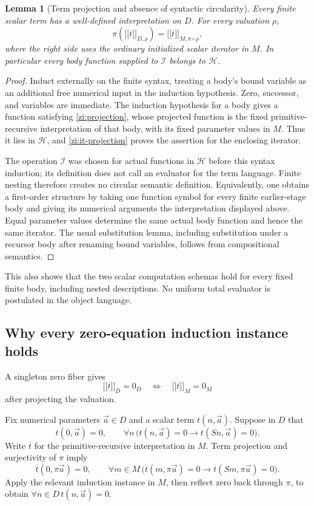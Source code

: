 \documentclass[11pt]{article}
\newtheorem{lemma}[theorem]{Lemma}
\theoremstyle{definition}
\newcommand{\llbracket}{\mathopen{[\![}}
\newcommand{\rrbracket}{\mathclose{]\!]}}
\begin{document}
\begin{lemma}[Term projection and absence of syntactic circularity]
\label{zi:term-projection}
Every finite scalar term has a well-defined interpretation on \(D\). For every valuation \(\rho\),
\[
\pi(\llbracket t\rrbracket_{D,\rho})
=
\llbracket t\rrbracket_{M,\pi\circ\rho},
\]
where the right side uses the ordinary initialized scalar iterator in \(M\). In particular every body function supplied to \(\mathcal I\) belongs to \(\mathscr H\).
\end{lemma}
\begin{proof}
Induct externally on the finite syntax, treating a body's bound variable as an additional free numerical input in the induction hypothesis. Zero, successor, and variables are immediate. The induction hypothesis for a body gives a function satisfying \eqref{zi:projection}, whose projected function is the fixed primitive-recursive interpretation of that body, with its fixed parameter values in \(M\). Thus it lies in \(\mathscr H\), and \eqref{zi:it-projection} proves the assertion for the enclosing iterator.

The operation \(\mathcal I\) was chosen for actual functions in \(\mathscr H\) before this syntax induction; its definition does not call an evaluator for the term language. Finite nesting therefore creates no circular semantic definition. Equivalently, one obtains a first-order structure by taking one function symbol for every finite earlier-stage body and giving its numerical arguments the interpretation displayed above. Equal parameter values determine the same actual body function and hence the same iterator. The usual substitution lemma, including substitution under a recursor body after renaming bound variables, follows from compositional semantics.
\end{proof}

This also shows that the two scalar computation schemas hold for every fixed finite body, including nested descriptions. No uniform total evaluator is postulated in the object language.

\subsection{Why every zero-equation induction instance holds}

A singleton zero fiber gives
\[
\llbracket t\rrbracket_D=0_D
\quad\Longleftrightarrow\quad
\llbracket t\rrbracket_M=0_M
\]
after projecting the valuation.

Fix numerical parameters \(\vec a\in D\) and a scalar term \(t(n,\vec a)\). Suppose in \(D\) that
\[
t(0,\vec a)=0,\qquad
\forall n\,\bigl(t(n,\vec a)=0\to t(Sn,\vec a)=0\bigr).
\]
Write \(\overline t\) for the primitive-recursive interpretation in \(M\).
Term projection and surjectivity of \(\pi\) imply
\[
\overline t(0,\pi\vec a)=0,\qquad
\forall m\in M\,
\bigl(\overline t(m,\pi\vec a)=0
      \to\overline t(Sm,\pi\vec a)=0\bigr).
\]
Apply the relevant induction instance in \(M\), then reflect zero back through \(\pi\), to obtain \(\forall n\in D\,t(n,\vec a)=0\).
\end{document}
